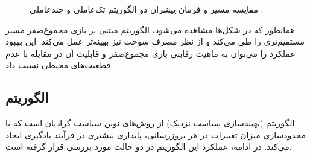 \begin{figure}[H]
	\centering
	
	
	\caption{
	مقایسه مسیر و فرمان پیشران دو الگوریتم تک‌عاملی و چندعاملی .
	}
\end{figure}

همانطور که در شکل‌ها مشاهده می‌شود، الگوریتم  مبتنی بر بازی مجموع‌صفر مسیر مستقیم‌تری را طی می‌کند و از نظر مصرف سوخت نیز بهینه‌تر عمل می‌کند. این بهبود عملکرد را می‌توان به ماهیت رقابتی بازی مجموع‌صفر و قابلیت آن در مقابله با عدم قطعیت‌های محیطی نسبت داد.

\subsection{الگوریتم }

الگوریتم  (بهینه‌سازی سیاست نزدیک) از روش‌های نوین سیاست گرادیان است که با محدودسازی میزان تغییرات در هر بروزرسانی، پایداری بیشتری در فرآیند یادگیری ایجاد می‌کند. در ادامه، عملکرد این الگوریتم در دو حالت مورد بررسی قرار گرفته است.

